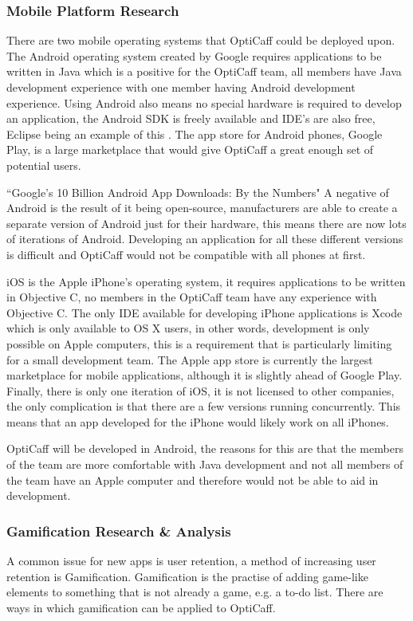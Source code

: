 \subsubsection{Mobile Platform Research}
There are two mobile operating systems that OptiCaff could be deployed upon. The Android operating system created by Google requires applications to be written in Java which is a positive for the OptiCaff team, all members have Java development experience with one member having Android development experience. Using Android also means no special hardware is required to develop an application, the Android SDK is freely available and IDE’s are also free, Eclipse being an example of this \cite{Eclipse}. The app store for Android phones, Google Play, is a large marketplace that would give OptiCaff a great enough set of potential users.

``Google’s 10 Billion Android App Downloads: By the Numbers" \newline
A negative of Android is the result of it being open-source, manufacturers are able to create a separate version of Android just for their hardware, this means there are now lots of iterations of Android. Developing an application for all these different versions is difficult and OptiCaff would not be compatible with all phones at first.

iOS is the Apple iPhone’s operating system, it requires applications to be written in Objective C, no members in the OptiCaff team have any experience with Objective C. The only IDE available for developing iPhone applications is Xcode which is only available to OS X users, in other words, development is only possible on Apple computers, this is a requirement that is particularly limiting for a small development team. The Apple app store is currently the largest marketplace for mobile applications, although it is slightly ahead of Google Play. Finally, there is only one iteration of iOS, it is not licensed to other companies, the only complication is that there are a few versions running concurrently. This means that an app developed for the iPhone would likely work on all iPhones.

OptiCaff will be developed in Android, the reasons for this are that the members of the team are more comfortable with Java development and not all members of the team have an Apple computer and therefore would not be able to aid in development.

\subsubsection{Gamification Research \& Analysis}
A common issue for new apps is user retention, a method of increasing user retention is Gamification. Gamification is the practise of adding game-like elements to something that is not already a game, e.g. a to-do list. There are ways in which gamification can be applied to OptiCaff.

